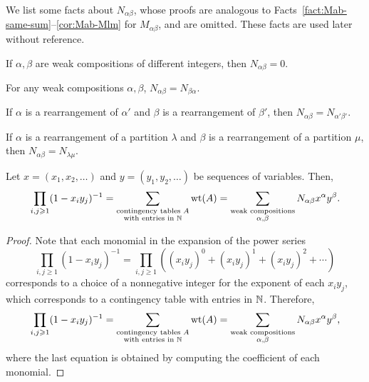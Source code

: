We list some facts about \(N_{\alpha\beta}\), whose proofs are analogous to Facts~\ref{fact:Mab-same-sum}--\ref{cor:Mab-Mlm} for \(M_{\alpha\beta}\), and are omitted.
These facts are used later without reference.

\begin{fact}
	If \(\alpha, \beta\) are weak compositions of different integers, then \(N_{\alpha\beta} = 0\).
\end{fact}

\begin{fact}
	For any weak compositions \(\alpha, \beta\),
	\(N_{\alpha\beta} = N_{\beta\alpha}\).
\end{fact}

\begin{fact}
	If \(\alpha\) is a rearrangement of \(\alpha'\) and \(\beta\) is a rearrangement of \(\beta'\),
	then \(N_{\alpha\beta} = N_{\alpha'\beta'}\).
\end{fact}

\begin{corollary}
	If \(\alpha\) is a rearrangement of a partition \(\lambda\) and \(\beta\) is a rearrangement of a partition \(\mu\),
	then \(N_{\alpha\beta} = N_{\lambda\mu}\).
\end{corollary}

\begin{lemma} \label{lem:generating-function-N-contingency-tables-compositions}
	Let \(x = (x_1, x_2, \ldots)\) and \(y = (y_1, y_2, \ldots)\) be sequences of variables.
	Then,
	\begin{equation}
		\prod_{i, j \geqslant 1} (1 - x_iy_j)^{-1}
		= \sum_{\substack{\text{contingency tables } A \\ \text{with entries in } \mathbb{N}}} \operatorname{wt}(A)
		= \sum_{\substack{\text{weak compositions} \\ \alpha, \beta}} N_{\alpha\beta} x^\alpha y^\beta.
	\end{equation}
\end{lemma}

\begin{proof}
	Note that each monomial in the expansion of the power series
	\begin{equation}
		\prod_{i, j \geq 1} (1 - x_iy_j)^{-1}
		= \prod_{i, j \geq 1} \left( (x_iy_j)^0 + (x_iy_j)^1 + (x_iy_j)^2 + \cdots \right)
	\end{equation}
	corresponds to a choice of a nonnegative integer for the exponent of each \(x_iy_j\), which corresponds to a contingency table with entries in \(\mathbb{N}\).
	Therefore,
	\begin{equation}
		\prod_{i, j \geqslant 1} (1 - x_iy_j)^{-1}
		= \sum_{\substack{\text{contingency tables } A \\ \text{with entries in } \mathbb{N}}} \operatorname{wt}(A) 
		= \sum_{\substack{\text{weak compositions} \\ \alpha, \beta}} N_{\alpha\beta} x^\alpha y^\beta, 
	\end{equation}
	where the last equation is obtained by computing the coefficient of each monomial.
\end{proof}

